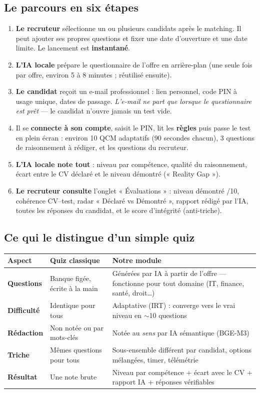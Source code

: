 \documentclass[11pt,a4paper]{article}
\begin{document}
\subsection{Le parcours en six étapes}
\begin{enumerate}
  \item \textbf{Le recruteur} sélectionne un ou plusieurs candidats après le matching.
        Il peut ajouter ses propres questions et fixer une date d'ouverture et une date
        limite. Le lancement est \textbf{instantané}.
  \item \textbf{L'IA locale} prépare le questionnaire de l'offre en arrière-plan
        (une seule fois par offre, environ 5 à 8 minutes ; réutilisé ensuite).
  \item \textbf{Le candidat} reçoit un e-mail professionnel : lien personnel, code PIN
        à usage unique, dates de passage. \emph{L'e-mail ne part que lorsque le
        questionnaire est prêt} --- le candidat n'ouvre jamais un test vide.
  \item Il se \textbf{connecte à son compte}, saisit le PIN, lit les \textbf{règles}
        puis passe le test en plein écran : environ 10 QCM adaptatifs (90 secondes
        chacun), 3 questions de raisonnement à rédiger, et les questions du recruteur.
  \item \textbf{L'IA locale note tout} : niveau par compétence, qualité du raisonnement,
        écart entre le CV déclaré et le niveau démontré (« Reality Gap »).
  \item \textbf{Le recruteur consulte} l'onglet « Évaluations » : niveau démontré /10,
        cohérence CV--test, radar « Déclaré vs Démontré », rapport rédigé par l'IA,
        toutes les réponses du candidat, et le score d'intégrité (anti-triche).
\end{enumerate}

\subsection{Ce qui le distingue d'un simple quiz}
\begin{center}
\begin{tabularx}{\textwidth}{>{\bfseries}p{3.2cm}XX}
\toprule
Aspect & Quiz classique & Notre module \\
\midrule
Questions & Banque figée, écrite à la main & Générées par IA à partir de l'offre ---
fonctionne pour tout domaine (IT, finance, santé, droit\ldots) \\
Difficulté & Identique pour tous & Adaptative (IRT) : converge vers le vrai niveau en
$\sim$10 questions \\
Rédaction & Non notée ou par mots-clés & Notée au \emph{sens} par IA sémantique (BGE-M3) \\
Triche & Mêmes questions pour tous & Sous-ensemble différent par candidat, options
mélangées, timer, télémétrie \\
Résultat & Une note brute & Niveau par compétence + écart avec le CV + rapport IA +
réponses vérifiables \\
\bottomrule
\end{tabularx}
\end{center}
\end{document}
